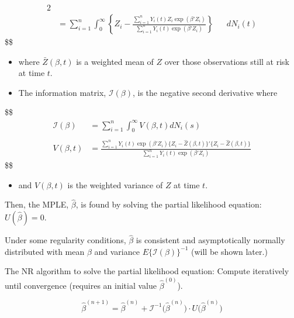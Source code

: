 \documentclass[
]{book}
\providecommand{\tightlist}{%
  \setlength{\itemsep}{0pt}\setlength{\parskip}{0pt}}
\begin{document}
{{{\begin{itemize}
\begin{alignat}{2}
  \\

  &= \sum_{i=1}^n \int_0^\infty \left \{ Z_i - \frac{\sum_{i=1}^n Y_i (t) Z_i \exp(\beta ' Z_i)}{\sum_{i=1}^n Y_i (t) \exp(\beta ' Z_i)} \right \}&&dN_i (t)

  \end{alignat}
  \$\$

  \begin{itemize}
  \item
    where \(\bar Z(\beta, t)\) is a weighted mean of \(Z\) over those observations still at risk at time \(t\).
  \item
    The information matrix, \(\mathcal I(\beta)\), is the negative second derivative where
  \end{itemize}

  \$\$
  \begin{align}

  \mathcal I(\beta) &= \sum\limits_{i=1}^n \int_0^\infty V(\beta, t) dN_i(s)

  \\
  \\

  V(\beta, t) &= \frac{\sum\limits_{i=1}^n Y_i(t) \exp(\beta ' Z_i ) \Big \{ Z_i - \hat Z (\beta, t)\Big\}'\Big \{ Z_i - \hat Z (\beta, t)\Big\}}{\sum\limits_{i=1}^n Y_i(t) \exp(\beta ' Z_i )}

  \end{align}
  \$\$

  \begin{itemize}
  \tightlist
  \item
    and \(V(\beta, t)\) is the weighted variance of \(Z\) at time \(t\).
  \end{itemize}
\end{itemize}

Then, the MPLE, \(\hat \beta\), is found by solving the partial likelihood equation: \(U(\hat \beta) = 0\).

Under some regularity conditions, \(\hat \beta\) is consistent and asymptotically normally distributed with mean \(\beta\) and variance \(E \Big \{ \mathcal I(\beta) \Big\}^{-1}\) (will be shown later.)

The NR algorithm to solve the partial likelihood equation: Compute iteratively until convergence (requires an initial value \(\hat \beta^{(0)}\)).

\[
\hat\beta^{(n+1)} = \hat\beta^{(n)} + \mathcal I ^{-1} \Big( \hat \beta^{(n)}\Big) \cdot U \Big( \hat \beta^{(n)}\Big)
\]

}}}
\end{document}
